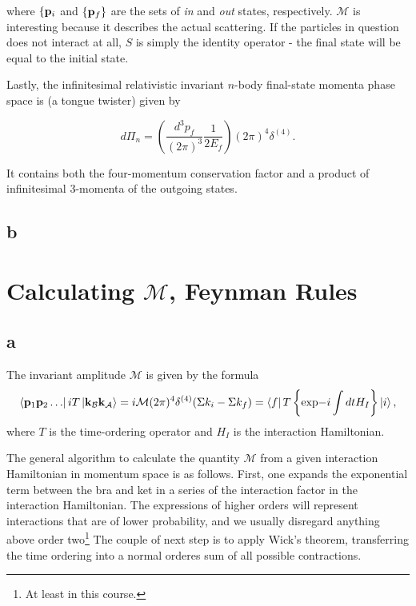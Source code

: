 \documentclass[11pt, a4paper]{amsart}
\begin{document}
where $\{\vb{p}_i$ and $\{\vb{p}_f\}$ are the sets of \emph{in} and \emph{out} states, respectively. $\mathcal{M}$ is interesting because it describes the actual scattering. If the particles in question does not interact at all, $S$ is simply the identity operator - the final state will be equal to the initial state.

Lastly, the infinitesimal relativistic invariant $n$-body final-state momenta phase space is (a tongue twister) given by

\begin{equation}
d\Pi_n = \left(\frac{d^3p_f}{(2\pi)^3} \frac{1}{2E_f}\right) (2\pi)^4 \delta^(4).
\end{equation}

It contains both the four-momentum conservation factor and a product of infinitesimal 3-momenta of the outgoing states.

\subsection*{b}

\section{Calculating $\mathcal{M}$, Feynman Rules}

\subsection*{a}

The invariant amplitude $\mathcal{M}$ is given by the formula
\begin{equation}
\bra{\vb{p}_1 \vb{p}_2 \dots} iT \ket{\vb{k}_{\mathcal{B}}\vb{k}_{\mathcal{A}}} = i \mathcal{M} (2\pi)^4 \delta^{(4)}(\Sigma k_i -\Sigma  k_f)
= \bra{f}T\left\{\text{exp}{-i\int dt H_I} \right\} \ket{i},
\end{equation}
where $T$ is the time-ordering operator and $H_I$ is the interaction Hamiltonian.

The general algorithm to calculate the quantity $\mathcal{M}$ from a given interaction Hamiltonian in momentum space is as follows. First, one expands the exponential term between the bra and ket in a series of the interaction factor in the interaction Hamiltonian. The expressions of higher orders will represent interactions that are of lower probability, and we usually disregard anything above order two\footnote{At least in this course.} The couple of next step is to apply Wick's theorem, transferring the time ordering into a normal orderes sum of all possible contractions.
\end{document}
